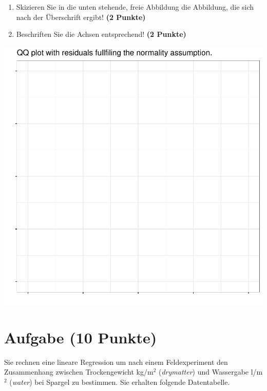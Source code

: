 \documentclass[a4paper, 10pt]{scrartcl}\usepackage[]{graphicx}\usepackage[]{xcolor}
\makeatletter
\def\maxwidth{ %
  \ifdim\Gin@nat@width>\linewidth
    \linewidth
  \else
    \Gin@nat@width
  \fi
}
\makeatother
\begin{document}
\begin{enumerate}
\item Skizieren Sie in die unten stehende, freie Abbildung die
  Abbildung, die sich nach der {\"U}berschrift ergibt! \textbf{(2 Punkte)}
\item Beschriften Sie die Achsen entsprechend! \textbf{(2 Punkte)}
\end{enumerate}



{\centering \includegraphics[width=\maxwidth]{img/regression-04-1} 

}



 
\clearpage

\section{Aufgabe \hfill (10 Punkte)}

Sie rechnen eine lineare Regression um nach einem Feldexperiment den
Zusammenhang zwischen Trockengewicht kg/m$^2$ (\textit{drymatter}) und
Wassergabe l/m$^2$ (\textit{water}) bei Spargel zu bestimmen. Sie erhalten
folgende Datentabelle.
\end{document}
